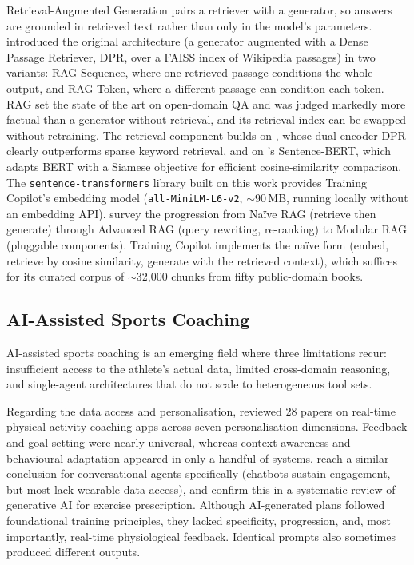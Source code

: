 Retrieval-Augmented Generation pairs a retriever with a generator, so answers are grounded in retrieved text rather than only in the model's parameters. \cite{lewis_retrieval-augmented_2020} introduced the original architecture (a generator augmented with a Dense Passage Retriever, DPR, over a FAISS index of Wikipedia passages) in two variants: RAG-Sequence, where one retrieved passage conditions the whole output, and RAG-Token, where a different passage can condition each token. RAG set the state of the art on open-domain QA and was judged markedly more factual than a generator without retrieval, and its retrieval index can be swapped without retraining. The retrieval component builds on \cite{karpukhin_dense_2020}, whose dual-encoder DPR clearly outperforms sparse keyword retrieval, and on \cite{reimers_sentence-bert_2019}'s Sentence-BERT, which adapts BERT with a Siamese objective for efficient cosine-similarity comparison. The \texttt{sentence-transformers} library built on this work provides Training Copilot's embedding model (\texttt{all-MiniLM-L6-v2}, $\sim$90\,MB, running locally without an embedding API). \cite{gao_retrieval-augmented_2024} survey the progression from Na\"ive RAG (retrieve then generate) through Advanced RAG (query rewriting, re-ranking) to Modular RAG (pluggable components). Training Copilot implements the na\"ive form (embed, retrieve by cosine similarity, generate with the retrieved context), which suffices for its curated corpus of $\sim$32{,}000 chunks from fifty public-domain books.

\subsection{AI-Assisted Sports Coaching}\label{sec:sota:coaching}

AI-assisted sports coaching is an emerging field where three limitations recur: insufficient access to the athlete's actual data, limited cross-domain reasoning, and single-agent architectures that do not scale to heterogeneous tool sets.

Regarding the data access and personalisation, \cite{monteiro-guerra_personalization_2020} reviewed 28 papers on real-time physical-activity coaching apps across seven personalisation dimensions. Feedback and goal setting were nearly universal, whereas context-awareness and behavioural adaptation appeared in only a handful of systems. \cite{luo_promoting_2021} reach a similar conclusion for conversational agents specifically (chatbots sustain engagement, but most lack wearable-data access), and \cite{puce_harnessing_2025} confirm this in a systematic review of generative AI for exercise prescription. Although AI-generated plans followed foundational training principles, they lacked specificity, progression, and, most importantly, real-time physiological feedback. Identical prompts also sometimes produced different outputs.

